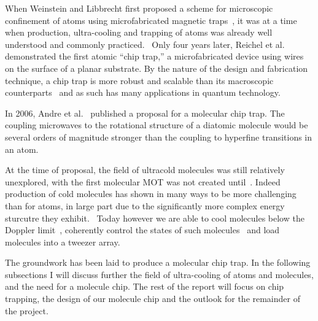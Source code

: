 
When Weinstein and Libbrecht first proposed a scheme for microscopic confinement
of atoms using microfabricated magnetic traps~\cite{PhysRevA.52.4004}, it was at
a time when production, ultra-cooling and trapping of atoms was already well
understood and commonly practiced.~ Only four
years later, Reichel et al.~\cite{Reichel1999} demonstrated the first atomic
``chip trap,'' a microfabricated device using wires on the surface of a planar
substrate. By the nature of the design and fabrication technique, a chip trap is
more robust and scalable than its macroscopic counterparts~ and
as such has many applications in quantum technology.


In 2006, Andre et al.~\cite{Andre2006} published a proposal for a molecular chip
trap. The coupling microwaves to the rotational structure of a diatomic molecule
would be several orders of magnitude stronger than the coupling to hyperfine
transitions in an atom. 

At the time of proposal, the field of ultracold molecules was still relatively
unexplored, with the first molecular MOT was not created until~. Indeed production of cold molecules has shown in many ways to be more
challenging than for atoms, in large part due to the significantly more complex
energy sturcutre they exhibit.~ Today however we are able to cool
molecules below the Doppler limit~\cite{Truppe2017}, coherently control the
states of such molecules~\cite{PhysRevLett.120.163201} and load molecules into a
tweezer array.~\cite{Anderegg2019}

The groundwork has been laid to produce a molecular chip trap. In the following
subsections I will discuss further the field of ultra-cooling of atoms and
molecules, and the need for a molecule chip. The rest of the report will focus
on chip trapping, the design of our molecule chip and the outlook for the
remainder of the project.

